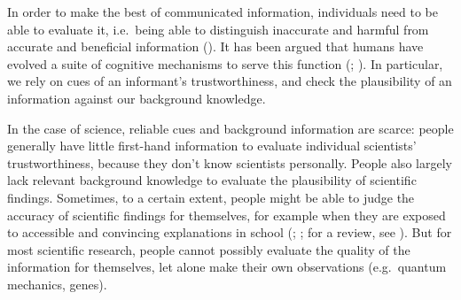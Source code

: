 \documentclass[
  jou,
  floatsintext,
  longtable,
  nolmodern,
  notxfonts,
  notimes,
  colorlinks=true,linkcolor=blue,citecolor=blue,urlcolor=blue]{apa7}
\begin{document}
In order to make the best of communicated information, individuals need
to be able to evaluate it, i.e.~being able to distinguish inaccurate and
harmful from accurate and beneficial information
(). It has been argued that humans have evolved a suite of cognitive
mechanisms to serve this function
(;
). In
particular, we rely on cues of an informant's trustworthiness, and check
the plausibility of an information against our background knowledge.

In the case of science, reliable cues and background information are
scarce: people generally have little first-hand information to evaluate
individual scientists' trustworthiness, because they don't know
scientists personally. People also largely lack relevant background
knowledge to evaluate the plausibility of scientific findings.
Sometimes, to a certain extent, people might be able to judge the
accuracy of scientific findings for themselves, for example when they
are exposed to accessible and convincing explanations in school
(;
; for a review, see
). But for most scientific research, people cannot possibly
evaluate the quality of the information for themselves, let alone make
their own observations (e.g.~quantum mechanics, genes).
\end{document}
